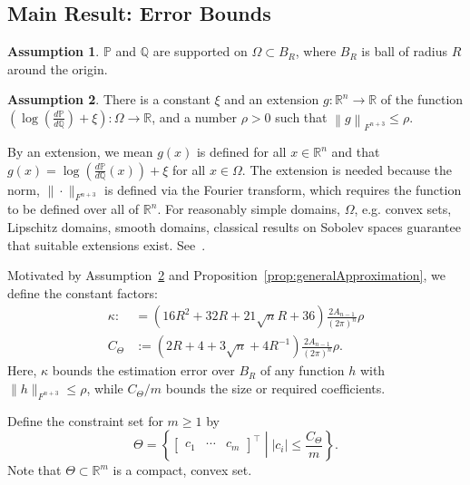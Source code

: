 \documentclass[twoside]{article}
\theoremstyle{definition}
\newtheorem{assumption}{Assumption}
\newcommand{\R}{\mathbb{R}}
\newcommand{\Prob}{\mathbb{P}}
\newcommand{\Q}{\mathbb{Q}}
\newcommand{\1}[1]{\scalebox{1.25}{$\mathds{1}$}\left[#1\right]}
\begin{document}
\subsection{Main Result: Error Bounds}

\begin{assumption}
\label{as:support}
$\Prob$ and $\Q$ are supported on $\Omega\subset B_R$, where $B_R$ is ball of radius $R$ around the origin.
\end{assumption}

\begin{assumption}
\label{as:smooth}
There is a constant $\xi$ and an extension $g:\R^n\to \R$ of the function $\left(\log\left(\frac{d\Prob}{d\Q} \right)+\xi\right):\Omega\to \R$, and a number $\rho >0$ such that  
$\left\|g\right\|_{F^{n+3}}\le \rho$.
\end{assumption}

By an extension, we mean $g(x)$ is defined for all $x\in\R^n$ and that $g(x)=\log\left(\frac{d\Prob}{d\Q}(x)\right)+\xi$ for all $x\in\Omega$. The extension is needed because the norm, $\|\cdot\|_{F^{n+3}}$ is defined via the Fourier transform, which requires the function to be defined over all of $\R^n$. For reasonably simple domains, $\Omega$, e.g. convex sets, Lipschitz domains, smooth domains, classical results on Sobolev spaces guarantee that suitable extensions exist. See~\cite{adams2003sobolev,stein1970singular}. 

Motivated by Assumption~\ref{as:smooth} and Proposition~\ref{prop:generalApproximation}, we define the constant factors:
\begin{align}
\label{eq:estErrorBound}
\kappa:&=
\left(
16R^2+32R+21\sqrt{n}R+36
\right)\frac{2A_{n-1}}{(2\pi)^n}
\rho \\
C_{\Theta} &:=\left(2R + 4+3\sqrt{n}  + 4R^{-1}\right)\frac{2A_{n-1}}{(2\pi)^n}
      \rho.
\end{align}
Here, $\kappa$ bounds the estimation error over $B_R$ of any function $h$ with $\|h\|_{F^{n+3}}\le \rho$, while $C_{\Theta}/m$ bounds the size or required coefficients. 




Define the constraint set for $m\ge 1$ by
\begin{equation}
\label{eq:constraints}
\Theta = \left\{\begin{bmatrix} c_1 & \cdots & c_m \end{bmatrix}^\top \middle| 
 |c_i| \le 
 \frac{C_{\Theta} }{m}
\right\}.
\end{equation}
Note that $\Theta\subset \R^{m}$ is a compact, convex set.
\end{document}

